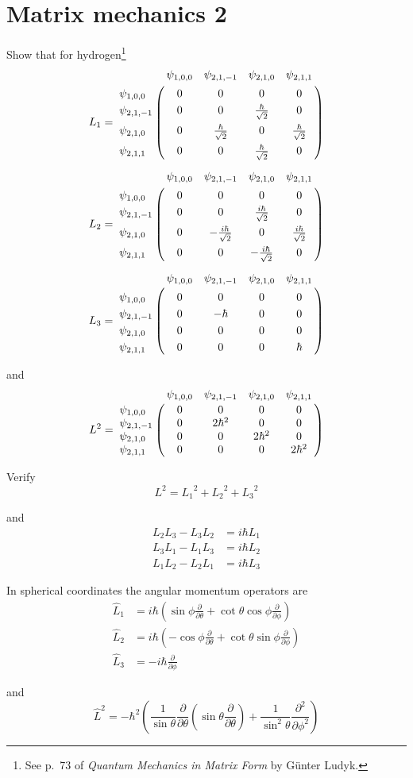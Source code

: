 

\section*{Matrix mechanics 2}

Show that for hydrogen\footnote
{See p.~73 of {\it Quantum Mechanics in Matrix Form} by G\"unter Ludyk.}
\begin{align*}
L_1&=
\bordermatrix{
& \psi_{1,0,0} & \psi_{2,1,-1} & \psi_{2,1,0} & \psi_{2,1,1} \cr
\psi_{1,0,0} & 0 & 0 & 0 & 0 \cr
\psi_{2,1,-1} & 0 & 0 & \frac{\hbar}{\sqrt2} & 0 \cr
\psi_{2,1,0} & 0 & \frac{\hbar}{\sqrt2} & 0 & \frac{\hbar}{\sqrt2} \cr
\psi_{2,1,1} & 0 & 0 & \frac{\hbar}{\sqrt2} & 0
}
\\[1ex]
L_2&=
\bordermatrix{
& \psi_{1,0,0} & \psi_{2,1,-1} & \psi_{2,1,0} & \psi_{2,1,1} \cr
\psi_{1,0,0} & 0 & 0 & 0 & 0 \cr
\psi_{2,1,-1} & 0 & 0 & \frac{i\hbar}{\sqrt2} & 0 \cr
\psi_{2,1,0} & 0 & -\frac{i\hbar}{\sqrt2} & 0 & \frac{i\hbar}{\sqrt2} \cr
\psi_{2,1,1} & 0 & 0 & -\frac{i\hbar}{\sqrt2} & 0
}
\\[1ex]
L_3&=
\bordermatrix{
& \psi_{1,0,0} & \psi_{2,1,-1} & \psi_{2,1,0} & \psi_{2,1,1} \cr
\psi_{1,0,0} & 0 & 0 & 0 & 0 \cr
\psi_{2,1,-1} & 0 & -\hbar & 0 & 0 \cr
\psi_{2,1,0} & 0 & 0 & 0 & 0 \cr
\psi_{2,1,1} & 0 & 0 & 0 & \hbar
}
\end{align*}

and
\begin{equation*}
L^2=
\bordermatrix{
& \psi_{1,0,0} & \psi_{2,1,-1} & \psi_{2,1,0} & \psi_{2,1,1} \cr
\psi_{1,0,0} & 0 & 0 & 0 & 0 \cr
\psi_{2,1,-1} & 0 & 2\hbar^2 & 0 & 0 \cr
\psi_{2,1,0} & 0 & 0 & 2\hbar^2 & 0 \cr
\psi_{2,1,1} & 0 & 0 & 0 & 2\hbar^2
}
\end{equation*}

Verify
\begin{equation*}
L^2={L_1}^2+{L_2}^2+{L_3}^2
\end{equation*}

and
\begin{align*}
L_2L_3-L_3L_2&=i\hbar L_1
\\
L_3L_1-L_1L_3&=i\hbar L_2
\\
L_1L_2-L_2L_1&=i\hbar L_3
\end{align*}

In spherical coordinates the angular momentum operators are
\begin{align*}
\hat L_1&=i\hbar\left(\sin\phi\frac{\partial}{\partial\theta}
+\cot\theta\cos\phi\frac{\partial}{\partial\phi}\right)
\\
\hat L_2&=i\hbar\left(-\cos\phi\frac{\partial}{\partial\theta}
+\cot\theta\sin\phi\frac{\partial}{\partial\phi}\right)
\\
\hat L_3&=-i\hbar\frac{\partial}{\partial\phi}
\end{align*}

and
\begin{equation*}
\hat L^2=-\hbar^2\left(\frac{1}{\sin\theta}\frac{\partial}{\partial\theta}
\left(\sin\theta\frac{\partial}{\partial\theta}\right)
+\frac{1}{\sin^2\theta}\frac{\partial^2}{\partial\phi^2}\right)
\end{equation*}


